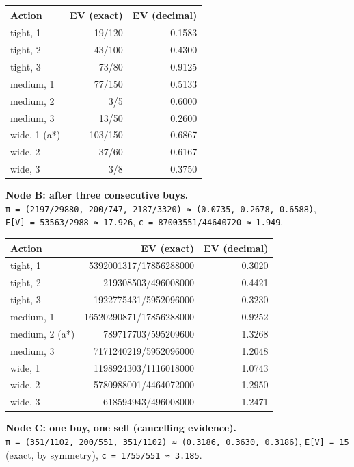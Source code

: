 \documentclass[
  10pt,
]{article}
\newcounter{none} %
\begin{document}
{\def\LTcaptype{none} %
\begin{longtable}[]{@{}lrr@{}}
\toprule\noalign{}
Action & EV (exact) & EV (decimal) \\
\midrule\noalign{}
\endhead
\bottomrule\noalign{}
\endlastfoot
tight, 1 & −19/120 & −0.1583 \\
tight, 2 & −43/100 & −0.4300 \\
tight, 3 & −73/80 & −0.9125 \\
medium, 1 & 77/150 & 0.5133 \\
medium, 2 & 3/5 & 0.6000 \\
medium, 3 & 13/50 & 0.2600 \\
wide, 1 (a*) & 103/150 & 0.6867 \\
wide, 2 & 37/60 & 0.6167 \\
wide, 3 & 3/8 & 0.3750 \\
\end{longtable}
}

\textbf{Node B: after three consecutive buys.} \texttt{π\ =\ (2197/29880,\ 200/747,\ 2187/3320)\ ≈\ (0.0735,\ 0.2678,\ 0.6588)}, \texttt{E{[}V{]}\ =\ 53563/2988\ ≈\ 17.926}, \texttt{c\ =\ 87003551/44640720\ ≈\ 1.949}.

{\def\LTcaptype{none} %
\begin{longtable}[]{@{}lrr@{}}
\toprule\noalign{}
Action & EV (exact) & EV (decimal) \\
\midrule\noalign{}
\endhead
\bottomrule\noalign{}
\endlastfoot
tight, 1 & 5392001317/17856288000 & 0.3020 \\
tight, 2 & 219308503/496008000 & 0.4421 \\
tight, 3 & 1922775431/5952096000 & 0.3230 \\
medium, 1 & 16520290871/17856288000 & 0.9252 \\
medium, 2 (a*) & 789717703/595209600 & 1.3268 \\
medium, 3 & 7171240219/5952096000 & 1.2048 \\
wide, 1 & 1198924303/1116018000 & 1.0743 \\
wide, 2 & 5780988001/4464072000 & 1.2950 \\
wide, 3 & 618594943/496008000 & 1.2471 \\
\end{longtable}
}

\textbf{Node C: one buy, one sell (cancelling evidence).} \texttt{π\ =\ (351/1102,\ 200/551,\ 351/1102)\ ≈\ (0.3186,\ 0.3630,\ 0.3186)}, \texttt{E{[}V{]}\ =\ 15} (exact, by symmetry), \texttt{c\ =\ 1755/551\ ≈\ 3.185}.
\end{document}
